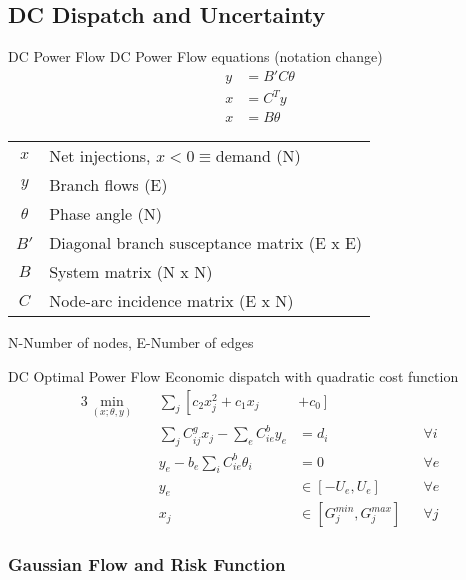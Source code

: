 \subsection{DC Dispatch and Uncertainty}
\begin{frame}{DC Power Flow}
DC Power Flow equations  \alert{(notation change)}
\pause
\begin{align*}
y&=B' C \theta \\
x &= C^T y \\
x & = B \theta
\end{align*}
\pause
\begin{tabular}{c l}
$x$ & Net injections, $x<0 \equiv $demand (N)\\
$y$ & Branch flows (E)\\
$\theta$ & Phase angle (N)\\
$B'$ & Diagonal branch susceptance matrix (E x E)\\
$B$ & System matrix (N x N)\\
$C$ & Node-arc incidence matrix (E x N)\\
\end{tabular}

\pause
N-Number of nodes, E-Number of edges 


\end{frame}


\begin{frame}{DC Optimal Power Flow}
Economic dispatch with quadratic cost function
\begin{alignat*}{3}
\min_{\left(x;\theta,y\right)} && \displaystyle\sum_j \left[  c_2 x_j^2 + c_1 x_j \right.&\left.+ c_0 \right] &   \\
                        && \textstyle \sum_j C^g_{ij} x_j - \sum_e C^b_{ie} y_e          &=d_i       && \forall i \\ 
                 && y_e - b_e \textstyle \sum_i C^b_{ie} \theta_i          &=0         && \forall e \\
                 && y_e &\in \left[ -U_e, U_e \right] && \forall e\\
                 && x_j &\in \left[ G^{min}_j, G^{max}_j \right] && \forall j  
\end{alignat*}
\end{frame}

\subsubsection{Gaussian Flow and Risk Function}

